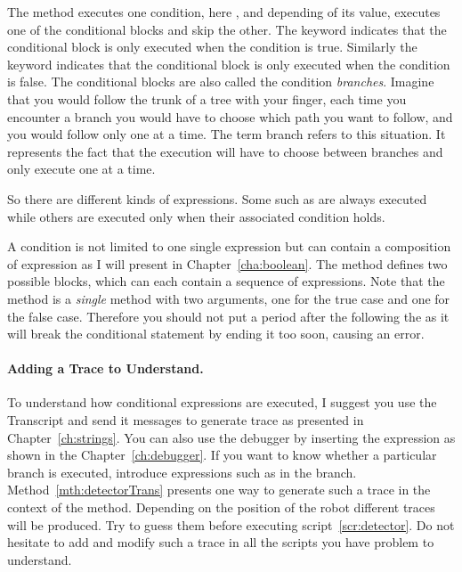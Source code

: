 The method  executes one condition, here , and depending of its value, executes one of the conditional blocks and skip the other. The keyword  indicates that the conditional block  is only executed when the condition is true. Similarly the keyword  indicates that  the conditional block   is only executed when the condition is false. The conditional blocks are also called the condition \emph{branches}.  Imagine that you would follow the trunk of a tree with your finger, each time you encounter a branch you would have to choose which path you want to follow, and you would follow only one at a time. The term branch refers to this situation. It represents the fact that the execution will have to choose between branches and only execute one at a time.


So there are different kinds of expressions. Some such as  are always executed while others are executed only when their associated condition holds. 

 A condition is not limited to one single expression but can contain a composition of expression as I will present in Chapter~\ref{cha:boolean}. The method  defines two possible blocks, which can each contain a sequence of expressions.  Note that the method  is a \textit{single} method with two arguments, one for the true case and one for the false case. Therefore you should not put a period after the \ct{]} following the  as it will break the conditional statement by ending it too soon, causing an error.

\paragraph{Adding a Trace to Understand.} To understand how conditional expressions are executed, I suggest you use the Transcript and send it messages to generate trace  as presented in Chapter~\ref{ch:strings}. You can also use the debugger by inserting the expression  as shown in the Chapter~\ref{ch:debugger}. If you want to know whether a particular  branch is executed, introduce expressions such as  in the branch.  Method~\ref{mth:detectorTrans} presents one way to generate such a trace in the context of the  method. Depending on the position of the robot different traces will be produced. Try to guess them before executing script~\ref{scr:detector}. Do not hesitate to add and modify such a trace in all the scripts you have problem to understand. 

